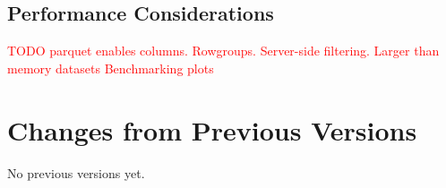 \documentclass[11pt,a4paper]{ivoa}
\begin{document}
    \subsection{Performance Considerations}
   \textcolor{red}{TODO parquet enables columns. Rowgroups. Server-side filtering. Larger than memory datasets Benchmarking plots}

\appendix
\section{Changes from Previous Versions}
No previous versions yet.


\end{document}
